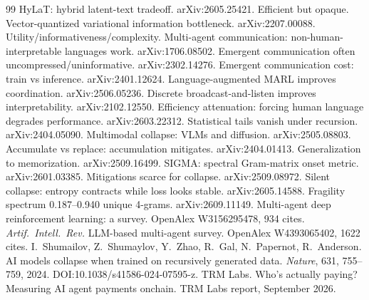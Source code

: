 \documentclass[11pt]{article}
\begin{document}
\begin{thebibliography}{99}
 HyLaT: hybrid latent-text tradeoff. arXiv:2605.25421. Efficient but opaque.
 Vector-quantized variational information bottleneck. arXiv:2207.00088. Utility/informativeness/complexity.
 Multi-agent communication: non-human-interpretable languages work. arXiv:1706.08502.
 Emergent communication often uncompressed/uninformative. arXiv:2302.14276.
 Emergent communication cost: train vs inference. arXiv:2401.12624.
 Language-augmented MARL improves coordination. arXiv:2506.05236.
 Discrete broadcast-and-listen improves interpretability. arXiv:2102.12550.
 Efficiency attenuation: forcing human language degrades performance. arXiv:2603.22312.
 Statistical tails vanish under recursion. arXiv:2404.05090.
 Multimodal collapse: VLMs and diffusion. arXiv:2505.08803.
 Accumulate vs replace: accumulation mitigates. arXiv:2404.01413.
 Generalization to memorization. arXiv:2509.16499.
 SIGMA: spectral Gram-matrix onset metric. arXiv:2601.03385.
 Mitigations scarce for collapse. arXiv:2509.08972.
 Silent collapse: entropy contracts while loss looks stable. arXiv:2605.14588.
 Fragility spectrum 0.187--0.940 unique 4-grams. arXiv:2609.11149.
 Multi-agent deep reinforcement learning: a survey. OpenAlex W3156295478, 934 cites. \textit{Artif.\ Intell.\ Rev.}
 LLM-based multi-agent survey. OpenAlex W4393065402, 1622 cites.
 I.\ Shumailov, Z.\ Shumaylov, Y.\ Zhao, R.\ Gal, N.\ Papernot, R.\ Anderson. AI models collapse when trained on recursively generated data. \textit{Nature}, 631, 755--759, 2024. DOI:10.1038/s41586-024-07595-z.
 TRM Labs. Who's actually paying? Measuring AI agent payments onchain. TRM Labs report, September 2026.


\end{thebibliography}
\end{document}
